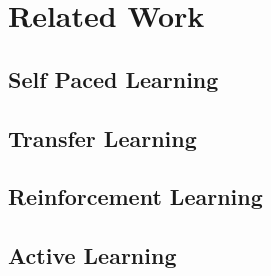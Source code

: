 \chapter{Related Work}

\section{Self Paced Learning}

\section{Transfer Learning}

\section{Reinforcement Learning}

\section{Active Learning}
